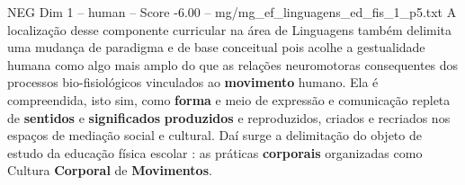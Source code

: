 \begin{textsample}{NEG Dim 1 – human – Score -6.00 – mg/mg\_ef\_linguagens\_ed\_fis\_1\_p5.txt}  \label{ex:f1_neg_018}
A localização desse componente curricular na área de Linguagens também delimita uma mudança de paradigma e de base conceitual pois acolhe a gestualidade humana como algo mais amplo do que as relações neuromotoras consequentes dos processos bio-fisiológicos vinculados ao \textbf{movimento} humano.
Ela é compreendida, isto sim, como \textbf{forma} e meio de expressão e comunicação repleta de \textbf{sentidos} e \textbf{significados} \textbf{produzidos} e reproduzidos, criados e recriados nos espaços de mediação social e cultural.
Daí surge a delimitação do objeto de estudo da educação física escolar : as práticas \textbf{corporais} organizadas como Cultura \textbf{Corporal} de \textbf{Movimentos}.

\end{textsample}
